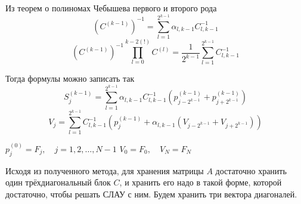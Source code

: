 Из теорем о полиномах Чебышева первого и второго рода
\[ (C^{(k-1)})^{-1} = \sum^{2^{k-1}}_{l=1} \alpha_{l, k-1} C_{l, k-1}^{-1} \]
\[ (C^{(k-1)})^{-1} \prod^{k-2 (!)}_{l=0} C^{(l)} = \frac{1}{2^{k-1}} \sum^{2^{k-1}}_{l=1} C_{l, k-1}^{-1} \]

Тогда формулы можно записать так
\[ S^{(k-1)}_j = \sum^{2^{k-1}}_{l=1} \alpha_{l, k-1} C_{l, k-1}^{-1} (p^{(k-1)}_{j-2^{k-1}} + p^{(k-1)}_{j+2^{k-1}}) \]
\[ V_j = \sum^{2^{k-1}}_{l=1} C_{l, k-1}^{-1} (p^{(k-1)}_j + \alpha_{l, k-1} (V_{j-2^{k-1}} + V_{j+2^{k-1}})) \]

\SetAlFnt{\normalsize}
\SetAlgoNoLine
{}

\begin{algorithm*}[H]
  \DontPrintSemicolon
  $ p^{(0)}_j = F_j, \quad j=1,2,\dots,N-1 $ \;
  $V_0 = F_0, \quad V_N = F_N$ \;
\end{algorithm*}

Исходя из полученного метода, для хранения матрицы $A$ достаточно хранить один трёхдиагональный блок $C$, и хранить его надо в такой форме, которой достаточно, чтобы решать СЛАУ с ним. Будем хранить три вектора диагоналей.
